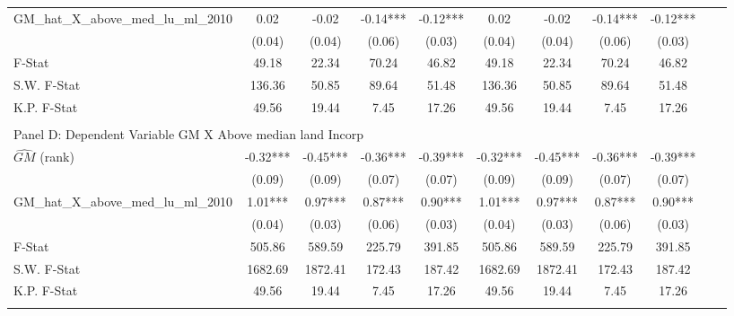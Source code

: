 \begin{table}[htbp]
\begin{threeparttable}
\begin{tabular}{l*{10}{c}}
\addlinespace
GM\_hat\_X\_above\_med\_lu\_ml\_2010&       0.02   &      -0.02   &      -0.14***&      -0.12***&       0.02   &      -0.02   &      -0.14***&      -0.12***\\
                &     (0.04)   &     (0.04)   &     (0.06)   &     (0.03)   &     (0.04)   &     (0.04)   &     (0.06)   &     (0.03)   \\
\midrule
F-Stat          &      49.18   &      22.34   &      70.24   &      46.82   &      49.18   &      22.34   &      70.24   &      46.82   \\
S.W. F-Stat     &     136.36   &      50.85   &      89.64   &      51.48   &     136.36   &      50.85   &      89.64   &      51.48   \\
K.P. F-Stat     &      49.56   &      19.44   &       7.45   &      17.26   &      49.56   &      19.44   &       7.45   &      17.26   \\
\cmidrule[\heavyrulewidth](lr){1-9} \\ \cmidrule[\heavyrulewidth](lr){1-9}
\multicolumn{8}{l}{Panel D: Dependent Variable GM X Above median land Incorp}\\
\cmidrule(lr){1-9}
$\hat{GM}$ (rank)&      -0.32***&      -0.45***&      -0.36***&      -0.39***&      -0.32***&      -0.45***&      -0.36***&      -0.39***\\
                &     (0.09)   &     (0.09)   &     (0.07)   &     (0.07)   &     (0.09)   &     (0.09)   &     (0.07)   &     (0.07)   \\
\addlinespace
GM\_hat\_X\_above\_med\_lu\_ml\_2010&       1.01***&       0.97***&       0.87***&       0.90***&       1.01***&       0.97***&       0.87***&       0.90***\\
                &     (0.04)   &     (0.03)   &     (0.06)   &     (0.03)   &     (0.04)   &     (0.03)   &     (0.06)   &     (0.03)   \\
\midrule
F-Stat          &     505.86   &     589.59   &     225.79   &     391.85   &     505.86   &     589.59   &     225.79   &     391.85   \\
S.W. F-Stat     &    1682.69   &    1872.41   &     172.43   &     187.42   &    1682.69   &    1872.41   &     172.43   &     187.42   \\
K.P. F-Stat     &      49.56   &      19.44   &       7.45   &      17.26   &      49.56   &      19.44   &       7.45   &      17.26   \\
\cmidrule[\heavyrulewidth](lr){1-9} \\ \cmidrule[\heavyrulewidth](lr){1-9}

\end{tabular}
\end{threeparttable}
\end{table}
